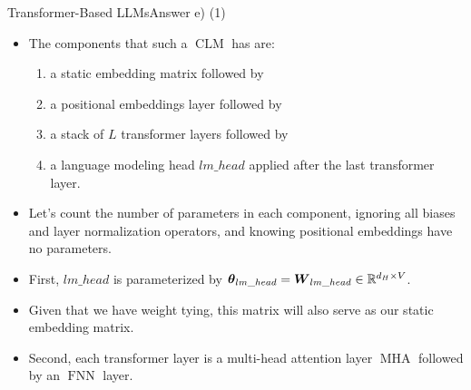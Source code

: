 \documentclass[t]{beamer}
\newcommand\op[1]{\operatorname{#1}}
\begin{document}
\begin{frame}{Transformer-Based LLMs}{Answer e) (1)}
    \begin{itemize}
        \item The components that such a $\op{CLM}$ has are:
              \begin{enumerate}
                  \item a static embedding matrix followed by
                  \item a positional embeddings layer followed by
                  \item a stack of $L$ transformer layers followed by
                  \item a language modeling head $lm\_head$ applied after the
                        last transformer layer.
              \end{enumerate}
        \item Let's count the number of parameters in each component, ignoring
              all biases and layer normalization operators, and knowing
              positional embeddings have no parameters.

        \item First, $lm\_head$ is parameterized by
              ${\boldsymbol{\theta}}_{lm\_head} = {\boldsymbol{W}}_{lm\_head}\in\mathbb{R}^{d_H\times V}$.
        \item Given that we have weight tying, this matrix will also serve as
              our static embedding matrix.
        \item Second, each transformer layer is a multi-head attention layer
              $\op{MHA}$ followed by an $\op{FNN}$ layer.
    \end{itemize}
\end{frame}
\end{document}
